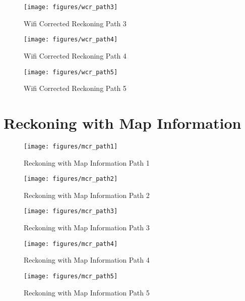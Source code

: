 \begin{figure}
    \centering
    \texttt{[image: figures/wcr\_path3]}
    \caption{Wifi Corrected Reckoning Path 3\label{fig:wcr_path3}}
\end{figure}

\begin{figure}
    \centering
    \texttt{[image: figures/wcr\_path4]}
    \caption{Wifi Corrected Reckoning Path 4\label{fig:wcr_path4}}
\end{figure}

\begin{figure}
    \centering
    \texttt{[image: figures/wcr\_path5]}
    \caption{Wifi Corrected Reckoning Path 5\label{fig:wcr_path5}}
\end{figure}


\section{Reckoning with Map Information}

\begin{figure}
    \centering
    \texttt{[image: figures/mcr\_path1]}
    \caption{Reckoning with Map Information Path 1\label{fig:mcr_path1}}
\end{figure}

\begin{figure}
    \centering
    \texttt{[image: figures/mcr\_path2]}
    \caption{Reckoning with Map Information Path 2\label{fig:mcr_path2}}
\end{figure}

\begin{figure}
    \centering
    \texttt{[image: figures/mcr\_path3]}
    \caption{Reckoning with Map Information Path 3\label{fig:mcr_path3}}
\end{figure}

\begin{figure}
    \centering
    \texttt{[image: figures/mcr\_path4]}
    \caption{Reckoning with Map Information Path 4\label{fig:mcr_path4}}
\end{figure}

\begin{figure}
    \centering
    \texttt{[image: figures/mcr\_path5]}
    \caption{Reckoning with Map Information Path 5\label{fig:mcr_path5}}
\end{figure}

